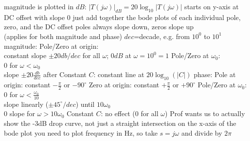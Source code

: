 \documentclass[12pt]{article}
\begin{document}
\begin{spacing}{0.8}
\begin{multicols*}{2}
\begin{flushleft}
\begin{outline}[longenum]

  \1 magnitude is plotted in $dB$: $|T(j\omega)|_{dB}=20\log_{10}|T(j\omega)|$
  \1 starts on y-axis at DC offset with slope 0
  \1 just add together the bode plots of each individual pole, zero, and the DC offset
  \1 poles always slope down, zeros slope up
    \\ (applies for both magnitude and phase)
  \1 $dec$=decade, e.g. from $10^0$ to $10^1$
  \1 magnitude:
    \2 Pole/Zero at origin:
      \\ constant slope $\pm20db/dec$ for all $\omega$; $0dB$ at $\omega=10^0=1$
    \2 Pole/Zero at $\omega_0$:
      \\ 0 for $\omega<\omega_0$
      \\ slope $\pm20\frac{db}{dec}$ after
    \2 Constant $C$: constant line at $20\log_{10}(|C|)$
  \1 phase:
    \2 Pole at origin: constant $-\frac{\pi}{2}$ or $-90^\circ$
    \2 Zero at origin: constant $+\frac{\pi}{2}$ or $+90^\circ$
    \2 Pole/Zero at $\omega_0$:
      \\ $0$ for $\omega<\frac{\omega_0}{10}$
      \\ slope linearly ($\pm45^\circ/dec$) until $10\omega_0$
      \\ $0$ slope for $\omega>10\omega_0$
    \2 Constant $C$: no effect ($0$ for all $\omega$)
  \1 Prof wants us to actually show the -3dB drop curve, not just a straight intersection
  \1 on the x-axis of the bode plot you need to plot frequency in Hz, so take $s=j\omega$ and divide by $2\pi$


\end{outline}
\end{flushleft}
\end{multicols*}
\end{spacing}
\end{document}
